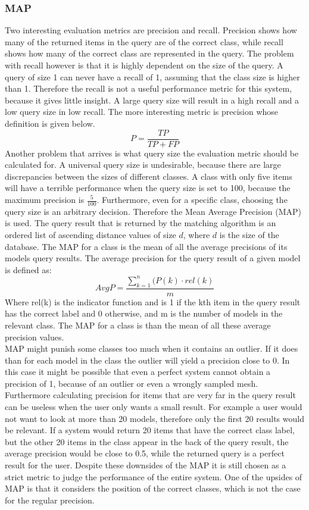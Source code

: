 \documentclass{bigdata}
\begin{document}
\subsubsection{MAP}
Two interesting evaluation metrics are precision and recall. Precision shows how many of the returned items in the query are of the correct class, while recall shows how many of the correct class are represented in the query. The problem with recall however is that it is highly dependent on the size of the query. A query of size 1 can never have a recall of 1, assuming that the class size is higher than 1. Therefore the recall is not a useful performance metric for this system, because it gives little insight. A large query size will result in a high recall and a low query size in low recall. The more interesting metric is precision whose definition is given below.
\begin{equation}
P = \frac{TP}{TP+FP}
\end{equation}
Another problem that arrives is what query size the evaluation metric should be calculated for. A universal query size is undesirable, because there are large discrepancies between the sizes of different classes. A class with only five items will have a terrible performance when the query size is set to 100, because the maximum precision is $\frac{5}{100}$. 
Furthermore, even for a specific class, choosing the query size is an arbitrary decision. Therefore the Mean Average Precision (MAP) is used.
The query result that is returned by the matching algorithm is an ordered list of ascending distance values of size $d$, where $d$ is the size of the database. The MAP for a class is the mean of all the average precisions of its models query results. The average precision for the query result of a given model is defined as:
\begin{equation}
AvgP = \frac{\sum_{k=1}^{n}(P(k) \cdot rel(k)}{m}
\end{equation}
Where rel(k) is the indicator function and is 1 if the kth item in the query result has the correct label and 0 otherwise, and m is the number of models in the relevant class. The MAP for a class is than the mean of all these average precision values.\\
MAP  might punish some classes too much when it contains an outlier. If it does than for each model in the class the outlier will yield a precision close to 0. In this case it might be possible that even a perfect system cannot obtain a precision of 1, because of an outlier or even a wrongly sampled mesh. Furthermore calculating precision for items that are very far in the query result can be useless when the user only wants a small result. For example a user would not want to look at more than 20 models, therefore only the first 20 results would be relevant. If a system would return 20 items that have the correct class label, but the other 20 items in the class appear in the back of the query result, the average precision would be close to 0.5, while the returned query is a perfect result for the user. Despite these downsides of the MAP it is still chosen as a strict metric to judge the performance of the entire system. One of the upsides of MAP is that it considers the position of the correct classes, which is not the case for the regular precision. 
\end{document}
